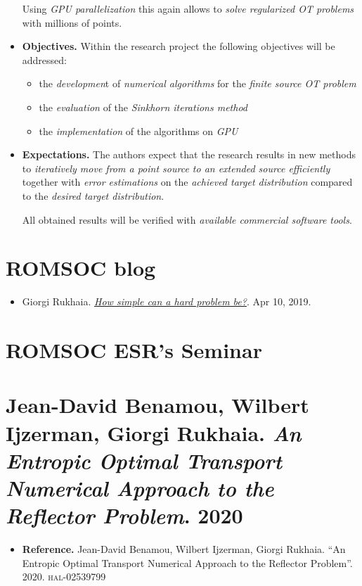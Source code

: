 \documentclass{book}
\numberwithin{equation}{section}
\begin{document}
\begin{itemize}
    Using \textit{GPU parallelization} this again allows to \textit{solve regularized OT problems} with millions of points.
    \item \textbf{Objectives.} Within the research project the following objectives will be addressed:
    \begin{itemize}
        \item the \textit{developmen}t of \textit{numerical algorithms} for the \textit{finite source OT problem}
        \item the \textit{evaluation} of the \textit{Sinkhorn iterations method}
        \item the \textit{implementation} of the algorithms on \textit{GPU}
    \end{itemize}
    \item \textbf{Expectations.} The authors expect that the research results in new methods to \textit{iteratively move from a point source to an extended source efficiently} together with \textit{error estimations} on the \textit{achieved target distribution} compared to the \textit{desired target distribution}.
    
    All obtained results will be verified with \textit{available commercial software tools}.
\end{itemize}

\section{ROMSOC blog}
\begin{itemize}
    \item Giorgi Rukhaia. \href{https://www.romsoc.eu/how-simple-can-a-hard-problem-be/}{\textit{How simple can a hard problem be?}}. Apr 10, 2019.
\end{itemize}

\section{ROMSOC ESR's Seminar}

\section{Jean-David Benamou, Wilbert Ijzerman, Giorgi Rukhaia. \textit{An Entropic Optimal Transport Numerical Approach to the Reflector Problem}. 2020}
\begin{itemize}
    \item \textbf{Reference.} Jean-David Benamou, Wilbert Ijzerman, Giorgi Rukhaia. ``An Entropic Optimal Transport Numerical Approach to the Reflector Problem''. 2020. \textsc{hal-02539799}
\end{itemize}
\end{document}
